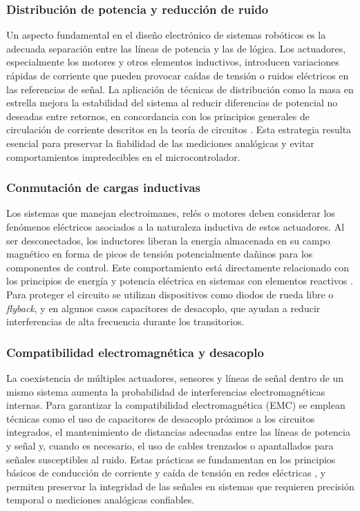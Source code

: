 \subsubsection{Distribución de potencia y reducción de ruido}

Un aspecto fundamental en el diseño electrónico de sistemas robóticos es la adecuada separación entre las líneas de potencia y las de lógica. Los actuadores, especialmente los motores y otros elementos inductivos, introducen variaciones rápidas de corriente que pueden provocar caídas de tensión o ruidos eléctricos en las referencias de señal. La aplicación de técnicas de distribución como la masa en estrella mejora la estabilidad del sistema al reducir diferencias de potencial no deseadas entre retornos, en concordancia con los principios generales de circulación de corriente descritos en la teoría de circuitos \cite{openstax_kcl_2022}. Esta estrategia resulta esencial para preservar la fiabilidad de las mediciones analógicas y evitar comportamientos impredecibles en el microcontrolador.

\subsubsection{Conmutación de cargas inductivas}

Los sistemas que manejan electroimanes, relés o motores deben considerar los fenómenos eléctricos asociados a la naturaleza inductiva de estos actuadores. Al ser desconectados, los inductores liberan la energía almacenada en su campo magnético en forma de picos de tensión potencialmente dañinos para los componentes de control. Este comportamiento está directamente relacionado con los principios de energía y potencia eléctrica en sistemas con elementos reactivos \cite{openstax_power_2020}. Para proteger el circuito se utilizan dispositivos como diodos de rueda libre o \emph{flyback}, y en algunos casos capacitores de desacoplo, que ayudan a reducir interferencias de alta frecuencia durante los transitorios.

\subsubsection{Compatibilidad electromagnética y desacoplo}

La coexistencia de múltiples actuadores, sensores y líneas de señal dentro de un mismo sistema aumenta la probabilidad de interferencias electromagnéticas internas. Para garantizar la compatibilidad electromagnética (EMC) se emplean técnicas como el uso de capacitores de desacoplo próximos a los circuitos integrados, el mantenimiento de distancias adecuadas entre las líneas de potencia y señal y, cuando es necesario, el uso de cables trenzados o apantallados para señales susceptibles al ruido. Estas prácticas se fundamentan en los principios básicos de conducción de corriente y caída de tensión en redes eléctricas \cite{openstax_kcl_2022}, y permiten preservar la integridad de las señales en sistemas que requieren precisión temporal o mediciones analógicas confiables.






